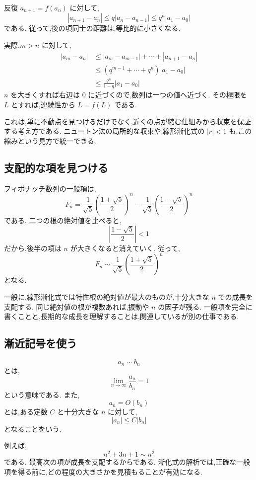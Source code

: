 反復 $a_{n+1}=f(a_n)$ に対して,
\[
  |a_{n+1}-a_n|
  \leq q|a_n-a_{n-1}|
  \leq q^n|a_1-a_0|
\]
である.
従って,後の項同士の距離は,等比的に小さくなる.

実際,$m>n$ に対して,
\[
  \begin{aligned}
    |a_m-a_n|
     & \leq
    |a_m-a_{m-1}|+\cdots+|a_{n+1}-a_n| \\
     & \leq
    (q^{m-1}+\cdots+q^n)|a_1-a_0|      \\
     & \leq
    \frac{q^n}{1-q}|a_1-a_0|
  \end{aligned}
\]
$n$ を大きくすれば右辺は $0$ に近づくので,数列は一つの値へ近づく.
その極限を $L$ とすれば,連続性から $L=f(L)$ である.

これは,単に不動点を見つけるだけでなく,近くの点が縮む仕組みから収束を保証する考え方である.
ニュートン法の局所的な収束や,線形漸化式の $|r|<1$ も,この縮みという見方で統一できる.

\subsection{支配的な項を見つける}

フィボナッチ数列の一般項は,
\[
  F_n=\frac1{\sqrt5}\left(\frac{1+\sqrt5}{2}\right)^n
  -\frac1{\sqrt5}\left(\frac{1-\sqrt5}{2}\right)^n
\]
である.
二つの根の絶対値を比べると,
\[
  \left|\frac{1-\sqrt5}{2}\right|<1
\]
だから,後半の項は $n$ が大きくなると消えていく.
従って,
\[
  F_n\sim
  \frac1{\sqrt5}
  \left(\frac{1+\sqrt5}{2}\right)^n
\]
となる.

一般に,線形漸化式では特性根の絶対値が最大のものが,十分大きな $n$ での成長を支配する.
同じ絶対値の根が複数あれば,振動や $n$ の因子が残る.
一般項を完全に書くことと,長期的な成長を理解することは,関連しているが別の仕事である.

\subsection{漸近記号を使う}

\[
  a_n\sim b_n
\]
とは,
\[
  \lim_{n\to\infty}\frac{a_n}{b_n}=1
\]
という意味である.
また,
\[
  a_n=O(b_n)
\]
とは,ある定数 $C$ と十分大きな $n$ に対して,
\[
  |a_n|\leq C|b_n|
\]
となることをいう.

例えば,
\[
  n^2+3n+1\sim n^2
\]
である.
最高次の項が成長を支配するからである.
漸化式の解析では,正確な一般項を得る前に,どの程度の大きさかを見積もることが有効になる.
